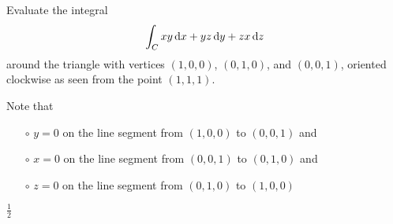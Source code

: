 \begin{question}[M317 2006D] %
Evaluate the integral
\begin{align*}
\int_C xy \,\mathrm{d}x + yz \,\mathrm{d}y + zx \,\mathrm{d}z
\end{align*}
around the triangle with vertices $(1, 0, 0)$, $(0, 1, 0)$, and $(0, 0, 1)$, 
oriented clockwise as seen from the point $(1, 1, 1)$.
\end{question}

\begin{hint} 
Note that 
\begin{itemize}\itemsep1pt \parskip0pt  %
\item[$\circ$]
$y=0$ on the line segment from $(1,0,0)$ to $(0, 0, 1)$ and
\item[$\circ$]
$x=0$ on the line segment from $(0,0,1)$ to $(0, 1, 0)$ and 
\item[$\circ$]
$z=0$ on the line segment from $(0, 1, 0)$ to $(1, 0, 0)$
\end{itemize}
\end{hint}

\begin{answer} 
$\frac{1}{2}$
\end{answer}

